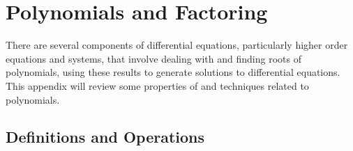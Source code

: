 \sectionnewpage

\section{Polynomials and Factoring}
\label{sec:polys}


There are several components of differential equations, particularly higher order equations and systems, that involve dealing with and finding roots of polynomials, using these results to generate solutions to differential equations. This appendix will review some properties of and techniques related to polynomials. 

\subsection{Definitions and Operations}

